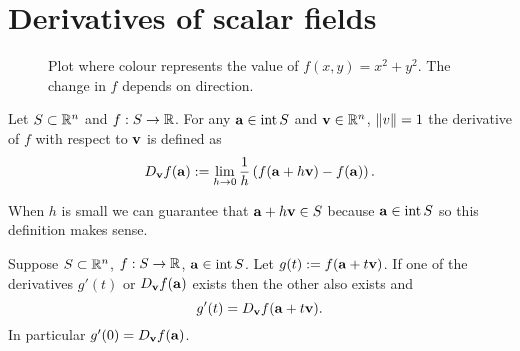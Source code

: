 \section{Derivatives of scalar fields}


\begin{figure}
    \begin{center}
        \caption{Plot where colour represents the value of \(f(x,y)=x^2 + y^2\). The change in \(f\) depends on direction.}
    \end{center}
\end{figure}




\begin{definition}
    Let \(S\subset \bR^n\) and \(f:S\to \bR\).
    For any \(\aa \in \operatorname{int}S\) and \(\vv \in \bR^n\), \(\norm{v}=1\) the derivative of \(f\) with respect to \(\vv\) is defined as
    \[
        D_{\vv}f(\aa) :=
        \lim_{h\to 0} \frac{1}{h}\left(  f(\aa+h \vv) - f(\aa)     \right).
    \]
\end{definition}


When \(h\) is small we can guarantee that \(\aa + h \vv \in S\) because \(\aa\in \operatorname{int} S\) so this definition makes sense.




\begin{theorem}
    Suppose \(S\subset \bR^n\), \(f:S\to \bR\), \(\aa \in \operatorname{int} S\).
    Let \(g(t) := f(\aa + t\vv)\).
    If one of the derivatives \(g'(t)\) or \(D_\vv f(\aa)\) exists then the other also exists and
    \[
        g'(t) = D_{\vv}f(\aa+t \vv).
    \]
    In particular \(g'(0) = D_{\vv}f(\aa)\).
\end{theorem}

